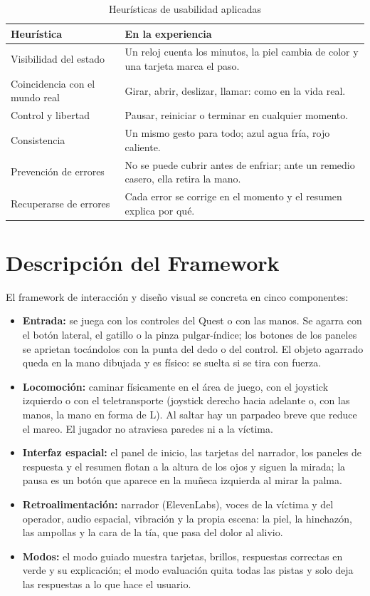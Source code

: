 \documentclass[11pt,a4paper]{article}
\begin{document}
\begin{table}[htbp]
\centering
\caption{Heurísticas de usabilidad aplicadas}
\label{tab:heuristicas}
\small
\begin{tabularx}{\linewidth}{@{}L{2.4cm} Y@{}}
\toprule
\textbf{Heurística} & \textbf{En la experiencia} \\
\midrule
Visibilidad del estado & Un reloj cuenta los minutos, la piel cambia de color y una tarjeta marca el paso. \\
Coincidencia con el mundo real & Girar, abrir, deslizar, llamar: como en la vida real. \\
Control y libertad & Pausar, reiniciar o terminar en cualquier momento. \\
Consistencia & Un mismo gesto para todo; azul agua fría, rojo caliente. \\
Prevención de errores & No se puede cubrir antes de enfriar; ante un remedio casero, ella retira la mano. \\
Recuperarse de errores & Cada error se corrige en el momento y el resumen explica por qué. \\
\bottomrule
\end{tabularx}
\end{table}

\section{Descripción del Framework}\label{sec:framework-desc}
El framework de interacción y diseño visual se concreta en cinco componentes:
\begin{itemize}
    \item \textbf{Entrada:} se juega con los controles del Quest o con las manos. Se agarra con el botón lateral, el gatillo o la pinza pulgar-índice; los botones de los paneles se aprietan tocándolos con la punta del dedo o del control. El objeto agarrado queda en la mano dibujada y es físico: se suelta si se tira con fuerza.
    \item \textbf{Locomoción:} caminar físicamente en el área de juego, con el joystick izquierdo o con el teletransporte (joystick derecho hacia adelante o, con las manos, la mano en forma de L). Al saltar hay un parpadeo breve que reduce el mareo. El jugador no atraviesa paredes ni a la víctima.
    \item \textbf{Interfaz espacial:} el panel de inicio, las tarjetas del narrador, los paneles de respuesta y el resumen flotan a la altura de los ojos y siguen la mirada; la pausa es un botón que aparece en la muñeca izquierda al mirar la palma.
    \item \textbf{Retroalimentación:} narrador (ElevenLabs), voces de la víctima y del operador, audio espacial, vibración y la propia escena: la piel, la hinchazón, las ampollas y la cara de la tía, que pasa del dolor al alivio.
    \item \textbf{Modos:} el modo guiado muestra tarjetas, brillos, respuestas correctas en verde y su explicación; el modo evaluación quita todas las pistas y solo deja las respuestas a lo que hace el usuario.
\end{itemize}
\end{document}
